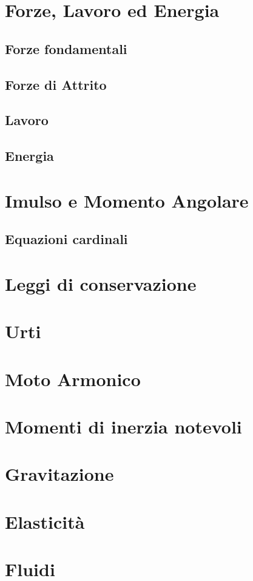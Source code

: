 \documentclass[70pt]{article}
\begin{document}
\begin{small}
\begin{multicols}{3}
\section{Forze, Lavoro ed Energia}
	\subsection{Forze fondamentali}
	\subsection{Forze di Attrito}
	\subsection{Lavoro}
	\subsection{Energia}
\section{Imulso e Momento Angolare}
	\subsection{Equazioni cardinali}
\section{Leggi di conservazione}
\section{Urti}
\section{Moto Armonico}
\section{Momenti di inerzia notevoli}
\section{Gravitazione}
\section{Elasticità}
\section{Fluidi}

\end{multicols}
\end{small}
\end{document}
